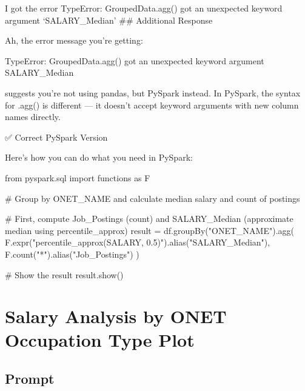\documentclass[
  letterpaper,
  DIV=11,
  numbers=noendperiod]{scrartcl}
\newenvironment{Shaded}{\begin{snugshade}}{\end{snugshade}}
\newcommand{\CommentTok}[1]{\textcolor[rgb]{0.37,0.37,0.37}{#1}}
\newcommand{\ImportTok}[1]{\textcolor[rgb]{0.00,0.46,0.62}{#1}}
\newcommand{\NormalTok}[1]{\textcolor[rgb]{0.00,0.23,0.31}{#1}}
\newcommand{\OperatorTok}[1]{\textcolor[rgb]{0.37,0.37,0.37}{#1}}
\newcommand{\PreprocessorTok}[1]{\textcolor[rgb]{0.68,0.00,0.00}{#1}}
\newcommand{\StringTok}[1]{\textcolor[rgb]{0.13,0.47,0.30}{#1}}
\begin{document}
I got the error TypeError: GroupedData.agg() got an unexpected keyword
argument `SALARY\_Median' \#\# Additional Response

Ah, the error message you're getting:

\begin{Shaded}
\begin{Highlighting}[]
\PreprocessorTok{TypeError}\NormalTok{: GroupedData.agg() got an unexpected keyword argument }\StringTok{\textquotesingle{}SALARY\_Median\textquotesingle{}}
\end{Highlighting}
\end{Shaded}

suggests you're not using pandas, but PySpark instead. In PySpark, the
syntax for .agg() is different --- it doesn't accept keyword arguments
with new column names directly.

✅ Correct PySpark Version

Here's how you can do what you need in PySpark:

\begin{Shaded}
\begin{Highlighting}[]
\ImportTok{from}\NormalTok{ pyspark.sql }\ImportTok{import}\NormalTok{ functions }\ImportTok{as}\NormalTok{ F}

\CommentTok{\# Group by ONET\_NAME and calculate median salary and count of postings}

\CommentTok{\# First, compute Job\_Postings (count) and SALARY\_Median (approximate median using percentile\_approx)}
\NormalTok{result }\OperatorTok{=}\NormalTok{ df.groupBy(}\StringTok{"ONET\_NAME"}\NormalTok{).agg(}
\NormalTok{    F.expr(}\StringTok{"percentile\_approx(SALARY, 0.5)"}\NormalTok{).alias(}\StringTok{"SALARY\_Median"}\NormalTok{),}
\NormalTok{    F.count(}\StringTok{"*"}\NormalTok{).alias(}\StringTok{"Job\_Postings"}\NormalTok{)}
\NormalTok{)}

\CommentTok{\# Show the result}
\NormalTok{result.show()}
\end{Highlighting}
\end{Shaded}

\section{Salary Analysis by ONET Occupation Type
Plot}\label{salary-analysis-by-onet-occupation-type-plot}

\subsection{Prompt}\label{prompt-3}
\end{document}
